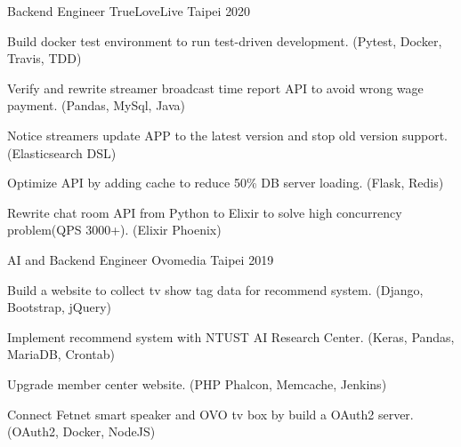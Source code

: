 

\begin{cventries}

  \cventry
    {Backend Engineer} %
    {TrueLoveLive} %
    {Taipei} %
    {2020} %
    {
      \begin{cvitems} %
        \item {Build docker test environment to run test-driven development. (Pytest, Docker, Travis, TDD)}
        \item {Verify and rewrite streamer broadcast time report API to avoid wrong wage payment. (Pandas, MySql, Java)}
        \item {Notice streamers update APP to the latest version and stop old version support. (Elasticsearch DSL)}
        \item {Optimize API by adding cache to reduce 50\% DB server loading. (Flask, Redis)}
        \item {Rewrite chat room API from Python to Elixir to solve high concurrency problem(QPS 3000+). (Elixir Phoenix)}
      \end{cvitems}
    }

  \cventry
    {AI and Backend Engineer} %
    {Ovomedia} %
    {Taipei} %
    {2019} %
    {
      \begin{cvitems} %
        \item {Build a website to collect tv show tag data for recommend system. (Django, Bootstrap, jQuery)}
        \item {Implement recommend system with NTUST AI Research Center. (Keras, Pandas, MariaDB, Crontab)}
        \item {Upgrade member center website. (PHP Phalcon, Memcache, Jenkins)}
        \item {Connect Fetnet smart speaker and OVO tv box by build a OAuth2 server. (OAuth2, Docker, NodeJS)}
      \end{cvitems}
    }

\end{cventries}
